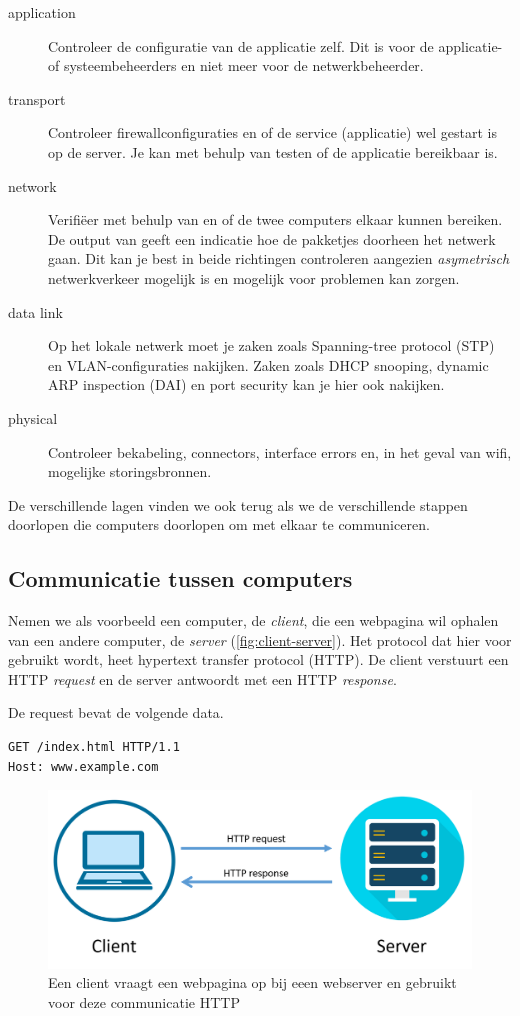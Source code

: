 \begin{description}
\item[application]
   Controleer de configuratie van de applicatie zelf.
   Dit is voor de applicatie- of systeembeheerders en niet meer voor de netwerkbeheerder.
\item[transport]
   Controleer firewallconfiguraties en of de service (applicatie) wel gestart is op de server.
   Je kan met behulp van  testen of de applicatie bereikbaar is.
\item[network]
   Verifiëer met behulp van  en  of de twee computers elkaar kunnen bereiken.
   De output van  geeft een indicatie hoe de pakketjes doorheen het netwerk gaan.
   Dit kan je best in beide richtingen controleren aangezien \emph{asymetrisch} netwerkverkeer mogelijk is en mogelijk voor problemen kan zorgen.
\item[data link]
   Op het lokale netwerk moet je zaken zoals Spanning-tree protocol (STP) en VLAN-configuraties nakijken.
   Zaken zoals DHCP snooping, dynamic ARP inspection (DAI) en port security kan je hier ook nakijken.
\item[physical]
  Controleer bekabeling, connectors, interface errors en, in het geval van wifi, mogelijke storingsbronnen.
\end{description}

De verschillende lagen vinden we ook terug als we de verschillende stappen doorlopen die computers doorlopen om met elkaar te communiceren.



\subsection{Communicatie tussen computers}

Nemen we als voorbeeld een computer, de \emph{client}, die een webpagina wil ophalen van een andere computer, de \emph{server} (\vref{fig:client-server}).
Het protocol dat hier voor gebruikt wordt, heet hypertext transfer protocol (HTTP).
De client verstuurt een HTTP \emph{request} en de server antwoordt met een HTTP \emph{response}.

De request bevat de volgende data.
\begin{verbatim}
GET /index.html HTTP/1.1
Host: www.example.com
\end{verbatim}

\begin{figure}
   \centering
   \includegraphics[width=.65\textwidth]{images/http-request.png}
   \caption{Een client vraagt een webpagina op bij eeen webserver en gebruikt voor deze communicatie HTTP}
   \label{fig:client-server}
\end{figure}

